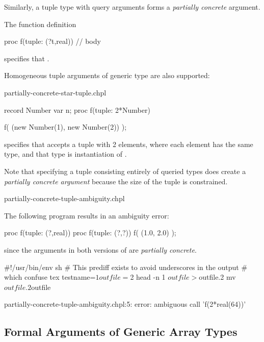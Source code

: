 Similarly, a tuple type with query arguments
forms a \emph{partially concrete} argument.
\begin{example}
The function definition
\begin{chapel}
proc f(tuple: (?t,real)) {
  // body
}
\end{chapel}
specifies that .
\end{example}

Homogeneous tuple arguments of generic type are also supported:
\begin{chapelexample}{partially-concrete-star-tuple.chpl}
\begin{chapel}
record Number {
  var n;
}
proc f(tuple: 2*Number) {
}
\end{chapel}
\begin{chapelpost}
f( (new Number(1), new Number(2)) );
\end{chapelpost}
\begin{chapeloutput}
\end{chapeloutput}

specifies that  accepts a tuple with 2 elements, where each
element has the same type, and that type is instantiation of
.
\end{chapelexample}

Note that specifying a tuple consisting entirely of queried types
does create a \emph{partially concrete argument} because the size
of the tuple is constrained.
\begin{chapelexample}{partially-concrete-tuple-ambiguity.chpl}

The following program results in an ambiguity error:
\begin{chapel}
proc f(tuple: (?,real)) {
}
proc f(tuple: (?,?)) {
}
f( (1.0, 2.0) );
\end{chapel}
since the  arguments in both versions of  are
\emph{partially concrete}.
\begin{chapelprediff}
\#!/usr/bin/env sh
\# This prediff exists to avoid underscores in the output
\# which confuse tex
testname=$1
outfile=$2
head -n 1 $outfile > $outfile.2
mv $outfile.2 $outfile
\end{chapelprediff}
\begin{chapeloutput}
partially-concrete-tuple-ambiguity.chpl:5: error: ambiguous call 'f(2*real(64))'
\end{chapeloutput}
\end{chapelexample}


\subsection{Formal Arguments of Generic Array Types}
\label{Formal_Arguments_of_Generic_Array_Types}

